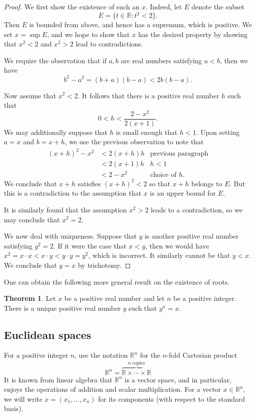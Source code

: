 \documentclass[12pt]{article}
\theoremstyle{definition}
\theoremstyle{theorem}
\newtheorem{theorem}[definition]{Theorem}
\begin{document}
\begin{proof}
We first show the existence of such an $x$. Indeed, let $E$ denote the subset  
\[
E = \{t \in \mathbb{R} : t^2 < 2\}.
\]
Then $E$ is bounded from above, and hence has a supremum, which is positive. We set $x = \sup E$, and we hope to show that $x$ has the desired property by showing that $x^2 < 2$ and $x^2 > 2$ lead to contradictions. 

We require the observation that if $a,b$ are real numbers satisfying $a < b$, then we have 
\[
b^2 - a^2 = (b+a)(b-a) < 2b (b-a).
\]

Now assume that $x^2 < 2$. It follows that there is a positive real number $h$ such that 
\[
0 < h < \frac{2 - x^2}{2(x+1)}.
\]
We may additionally suppose that $h$ is small enough that $h < 1$. Upon setting $a = x$ and $b = x+h$, we use the previous observation to note that 
\begin{align*}
(x+h)^2 - x^2 &< 2(x+h)h &\text{previous paragraph}\\
&< 2(x+1)h &h < 1 \\
&< 2 - x^2 &\text{choice of $h$}.
\end{align*}
We conclude that $x + h$ satisfies $(x+h)^2 < 2$ so that $x + h$ belongs to $E$. But this is a contradiction to the assumption that $x$ is an upper bound for $E$. 

It is similarly found that the assumption $x^2 > 2$ leads to a contradiction, so we may conclude that $x^2 = 2$. 


We now deal with uniqueness. Suppose that $y$ is another positive real number satisfying $y^2 = 2$. If it were the case that $x < y$, then we would have $x^2 = x \cdot x < x \cdot y < y \cdot y = y^2$, which is incorrect. It similarly cannot be that $y < x$. We conclude that $y = x$ by trichotomy. 
\end{proof}

One can obtain the following more general result on the existence of roots. 

\begin{theorem}
Let $x$ be a positive real number and let $n$ be a positive integer. There is a unique positive real number $y$ such that $y^n = x$. 
\end{theorem}

\subsection{Euclidean spaces}

For a positive integer $n$, use the notation $\mathbb{R}^n$ for the $n$-fold Cartesian product 
\[
\mathbb{R}^n = \overbrace{\mathbb{R} \times \cdots \times \mathbb{R}}^{n \; \text{copies}}
\]
It is known from linear algebra that $\mathbb{R}^n$ is a vector space, and in particular, enjoys the operations of addition and scalar multiplication. For a vector $x \in \mathbb{R}^n$, we will write $x = (x_1, \ldots, x_n)$ for its components (with respect to the standard basis). 
\end{document}
